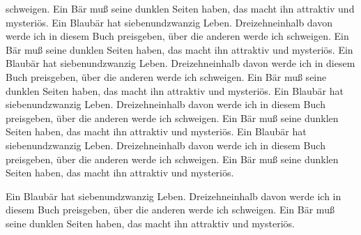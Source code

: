 \documentclass[a4paper,10pt]{article}
\begin{document}
schweigen. Ein B\"ar mu\ss{} seine dunklen
Seiten haben, das macht ihn attraktiv und
mysteri\"os.
Ein Blaub\"ar hat siebenundzwanzig Leben.
Dreizehneinhalb davon werde ich in diesem
Buch preisgeben, \"uber die anderen werde ich
schweigen. Ein B\"ar mu\ss{} seine dunklen
Seiten haben, das macht ihn attraktiv und
mysteri\"os.
Ein Blaub\"ar hat siebenundzwanzig Leben.
Dreizehneinhalb davon werde ich in diesem
Buch preisgeben, \"uber die anderen werde ich
schweigen. Ein B\"ar mu\ss{} seine dunklen
Seiten haben, das macht ihn attraktiv und
mysteri\"os.
Ein Blaub\"ar hat siebenundzwanzig Leben.
Dreizehneinhalb davon werde ich in diesem
Buch preisgeben, \"uber die anderen werde ich
schweigen. Ein B\"ar mu\ss{} seine dunklen
Seiten haben, das macht ihn attraktiv und
mysteri\"os.
Ein Blaub\"ar hat siebenundzwanzig Leben.
Dreizehneinhalb davon werde ich in diesem
Buch preisgeben, \"uber die anderen werde ich
schweigen. Ein B\"ar mu\ss{} seine dunklen
Seiten haben, das macht ihn attraktiv und
mysteri\"os.

Ein Blaub\"ar hat siebenundzwanzig Leben.
Dreizehneinhalb davon werde ich in diesem
Buch preisgeben, \"uber die anderen werde ich
schweigen. Ein B\"ar mu\ss{} seine dunklen
Seiten haben, das macht ihn attraktiv und
mysteri\"os.


\end{document}
